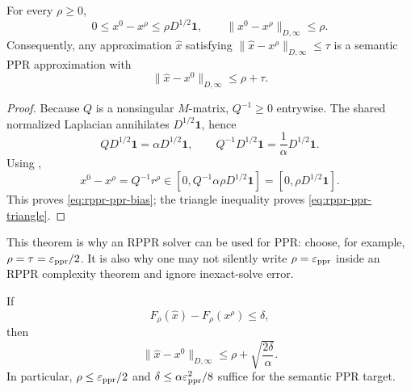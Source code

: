 \begin{theorem}
\label{thm:rppr-ppr-bias}
For every $\rho\geq0$,
\begin{equation}
 0\leq x^0-x^\rho\leq\rho D^{1/2}\mathbf1,
 \qquad
 \|x^0-x^\rho\|_{D,\infty}\leq\rho.
 \label{eq:rppr-ppr-bias}
\end{equation}
Consequently, any approximation $\widehat x$ satisfying
$\|\widehat x-x^\rho\|_{D,\infty}\leq\tau$ is a semantic PPR approximation
with
\begin{equation}
 \|\widehat x-x^0\|_{D,\infty}\leq\rho+\tau.
 \label{eq:rppr-ppr-triangle}
\end{equation}
\end{theorem}

\begin{proof}
Because $Q$ is a nonsingular $M$-matrix, $Q^{-1}\geq0$ entrywise.  The shared
normalized Laplacian annihilates $D^{1/2}\mathbf1$, hence
\begin{equation}
 QD^{1/2}\mathbf1=\alpha D^{1/2}\mathbf1,
 \qquad
 Q^{-1}D^{1/2}\mathbf1=\frac1\alpha D^{1/2}\mathbf1.
 \label{eq:degree-ground-state}
\end{equation}
Using ,
\begin{equation*}
 x^0-x^\rho=Q^{-1}r^\rho
 \in\left[0,
 Q^{-1}\alpha\rho D^{1/2}\mathbf1\right]
 =\left[0,\rho D^{1/2}\mathbf1\right].
\end{equation*}
This proves \eqref{eq:rppr-ppr-bias}; the triangle inequality proves
\eqref{eq:rppr-ppr-triangle}.
\end{proof}

This theorem is why an RPPR solver can be used for PPR: choose, for example,
$\rho=\tau=\varepsilon_{\rm ppr}/2$.  It is also why one may not silently
write $\rho=\varepsilon_{\rm ppr}$ inside an RPPR complexity theorem and
ignore inexact-solve error.

\begin{corollary}
\label{cor:objective-gap-conversion}
If
\begin{equation}
 F_\rho(\widehat x)-F_\rho(x^\rho)\leq\delta,
 \label{eq:rppr-objective-gap}
\end{equation}
then
\begin{equation}
 \|\widehat x-x^0\|_{D,\infty}
 \leq\rho+\sqrt{\frac{2\delta}{\alpha}}.
 \label{eq:objective-to-semantic}
\end{equation}
In particular, $\rho\leq\varepsilon_{\rm ppr}/2$ and
$\delta\leq\alpha\varepsilon_{\rm ppr}^2/8$ suffice for the semantic PPR
target.
\end{corollary}

